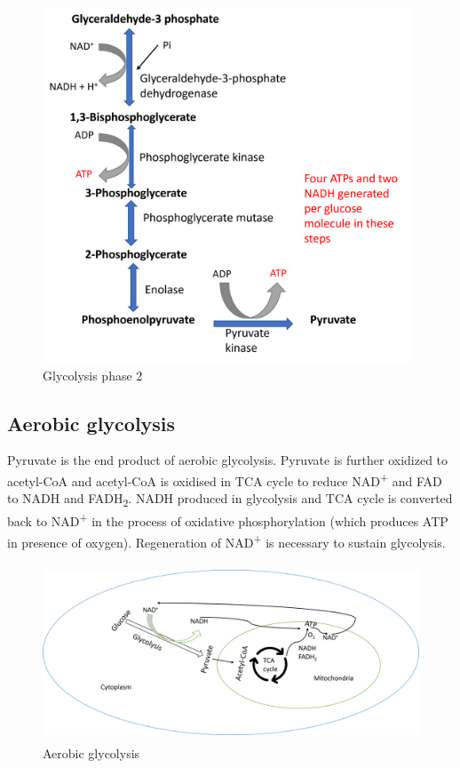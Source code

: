 \documentclass[
]{book}
\begin{document}
\begin{figure}
\centering
\includegraphics[width=\textwidth,height=4.16667in]{Images/Gly2.png}
\caption{Glycolysis phase 2}
\end{figure}

\subsection{Aerobic glycolysis}\label{aerobic-glycolysis}

Pyruvate is the end product of aerobic glycolysis. Pyruvate is further oxidized to acetyl-CoA and acetyl-CoA is oxidised in TCA cycle to reduce NAD\textsuperscript{+} and FAD to NADH and FADH\textsubscript{2}. NADH produced in glycolysis and TCA cycle is converted back to NAD\textsuperscript{+} in the process of oxidative phosphorylation (which produces ATP in presence of oxygen). Regeneration of NAD\textsuperscript{+} is necessary to sustain glycolysis.

\begin{figure}
\centering
\includegraphics[width=\textwidth,height=2.08333in]{Images/AerobicGlycolysis.png}
\caption{Aerobic glycolysis}
\end{figure}
\end{document}
